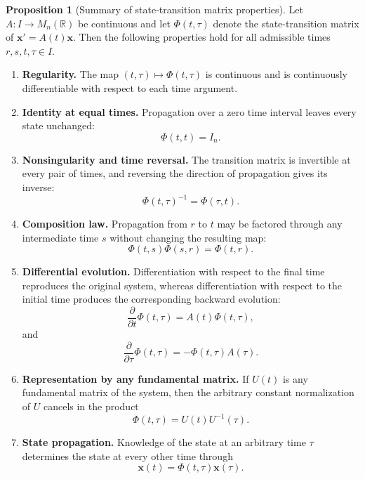 \documentclass[11pt,a4paper]{article}
\newcommand{\be}{\begin{equation}}
\newcommand{\ee}{\end{equation}}
\newcommand{\lb}[1]{\label{#1}}
\newcommand{\R}{\mathbb{R}}
\theoremstyle{definition}
\newtheorem{proposition}{Proposition}[section]
\numberwithin{equation}{section}
\begin{document}
\begin{proposition}[Summary of state-transition matrix properties]
Let $A:I\to M_n(\R)$ be continuous and let $\Phi(t,\tau)$ denote the state-transition matrix of $\mathbf{x}'=A(t)\mathbf{x}$. Then the following properties hold for all admissible times $r,s,t,\tau\in I$.
\begin{enumerate}
\item \textbf{Regularity.} The map $(t,\tau)\mapsto\Phi(t,\tau)$ is continuous and is continuously differentiable with respect to each time argument.

\item \textbf{Identity at equal times.} Propagation over a zero time interval leaves every state unchanged:
\be
\Phi(t,t)=I_n.
\lb{eq:transition-summary-identity}
\ee

\item \textbf{Nonsingularity and time reversal.} The transition matrix is invertible at every pair of times, and reversing the direction of propagation gives its inverse:
\be
\Phi(t,\tau)^{-1}=\Phi(\tau,t).
\lb{eq:transition-summary-inverse}
\ee

\item \textbf{Composition law.} Propagation from $r$ to $t$ may be factored through any intermediate time $s$ without changing the resulting map:
\be
\Phi(t,s)\Phi(s,r)=\Phi(t,r).
\lb{eq:transition-summary-composition}
\ee

\item \textbf{Differential evolution.} Differentiation with respect to the final time reproduces the original system, whereas differentiation with respect to the initial time produces the corresponding backward evolution:
\be
\frac{\partial}{\partial t}\Phi(t,\tau)
=A(t)\Phi(t,\tau),
\lb{eq:transition-summary-final-derivative}
\ee
and
\be
\frac{\partial}{\partial \tau}\Phi(t,\tau)
=-\Phi(t,\tau)A(\tau).
\lb{eq:transition-summary-initial-derivative}
\ee

\item \textbf{Representation by any fundamental matrix.} If $U(t)$ is any fundamental matrix of the system, then the arbitrary constant normalization of $U$ cancels in the product
\be
\Phi(t,\tau)=U(t)U^{-1}(\tau).
\lb{eq:transition-summary-fundamental}
\ee

\item \textbf{State propagation.} Knowledge of the state at an arbitrary time $\tau$ determines the state at every other time through
\be
\mathbf{x}(t)=\Phi(t,\tau)\mathbf{x}(\tau).
\lb{eq:transition-summary-state}
\ee
\end{enumerate}
\end{proposition}
\end{document}
